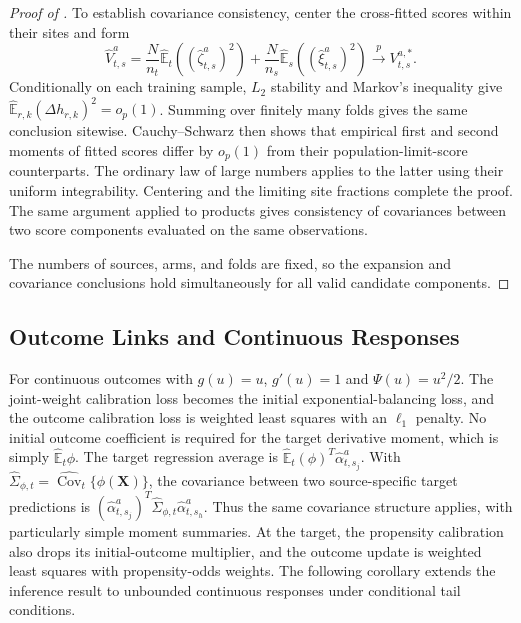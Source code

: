 \documentclass[12pt]{article}
\providecommand{\En}{\widehat{\mathbb E}}
\begin{document}
\begin{proof}[Proof of ]
To establish covariance consistency, center the cross-fitted scores within their sites and form
\[
\widehat V_{t,s}^a=\frac N{n_t}\En_t((\widehat\zeta_{t,s}^a)^2)
+\frac N{n_s}\En_s((\widehat\xi_{t,s}^a)^2)
\xrightarrow{p}V_{t,s}^{a,*}.
\]
Conditionally on each training sample, $L_2$ stability and Markov's inequality give $\En_{r,k}(\Delta h_{r,k})^2=o_p(1)$. Summing over finitely many folds gives the same conclusion sitewise. Cauchy--Schwarz then shows that empirical first and second moments of fitted scores differ by $o_p(1)$ from their population-limit-score counterparts. The ordinary law of large numbers applies to the latter using their uniform integrability. Centering and the limiting site fractions complete the proof. The same argument applied to products gives consistency of covariances between two score components evaluated on the same observations.

The numbers of sources, arms, and folds are fixed, so the expansion and covariance conclusions hold simultaneously for all valid candidate components.
\end{proof}

\subsection{Outcome Links and Continuous Responses}\label{supp:glm_specializations}\label{supp:linear_one_round_cf}
For continuous outcomes with $g(u)=u$, $g'(u)=1$ and $\Psi(u)=u^2/2$. The joint-weight calibration loss becomes the initial exponential-balancing loss, and the outcome calibration loss is weighted least squares with an $\ell_1$ penalty. No initial outcome coefficient is required for the target derivative moment, which is simply $\En_t\phi$. The target regression average is $\En_t(\phi)^T\widehat{\alpha}_{t,s_j}^a$. With $\widehat\Sigma_{\phi,t}=\widehat{\operatorname{Cov}}_t\{\phi(\boldsymbol X)\}$, the covariance between two source-specific target predictions is $(\widehat{\alpha}_{t,s_j}^a)^T\widehat\Sigma_{\phi,t}\widehat{\alpha}_{t,s_h}^a$. Thus the same covariance structure applies, with particularly simple moment summaries. At the target, the propensity calibration also drops its initial-outcome multiplier, and the outcome update is weighted least squares with propensity-odds weights. The following corollary extends the inference result to unbounded continuous responses under conditional tail conditions.
\end{document}
